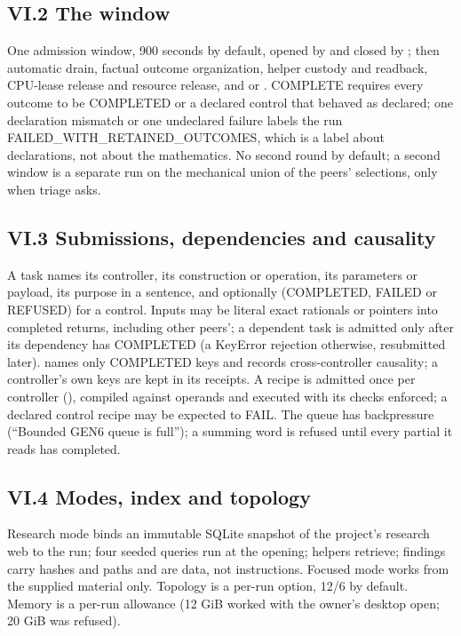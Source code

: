 \subsection{VI.2 The window}\label{vi.2-the-window}

One admission window, 900 seconds by default, opened by  and closed by ; then automatic
drain, factual outcome organization, helper custody and readback, CPU-lease release and resource release, and  or
. COMPLETE requires every outcome to be COMPLETED or a declared control that behaved as declared; one declaration mismatch or
one undeclared failure labels the run FAILED\_WITH\_RETAINED\_OUTCOMES, which is a label about declarations, not about the mathematics. No
second round by default; a second window is a separate run on the mechanical union of the peers' selections, only when triage asks.

\subsection{VI.3 Submissions, dependencies and causality}\label{vi.3-submissions-dependencies-and-causality}

A task names its controller, its construction or operation, its parameters or payload, its purpose in a sentence, and optionally
 (COMPLETED, FAILED or REFUSED) for a control. Inputs may be literal exact rationals or pointers 
into completed returns, including other peers'; a dependent task is admitted only after its dependency has COMPLETED (a KeyError rejection
otherwise, resubmitted later).  names only COMPLETED keys and records cross-controller causality; a controller's own keys are kept
in its receipts. A recipe is admitted once per controller (), compiled against operands and executed with its checks
enforced; a declared control recipe may be expected to FAIL. The queue has backpressure (``Bounded GEN6 queue is full''); a summing word is
refused until every partial it reads has completed.

\subsection{VI.4 Modes, index and topology}\label{vi.4-modes-index-and-topology}

Research mode binds an immutable SQLite snapshot of the project's research web to the run; four seeded queries run at the opening; helpers
retrieve; findings carry hashes and paths and are data, not instructions. Focused mode works from the supplied material only. Topology is
a per-run option, 12/6 by default. Memory is a per-run allowance (12 GiB worked with the owner's desktop open; 20 GiB was refused).


